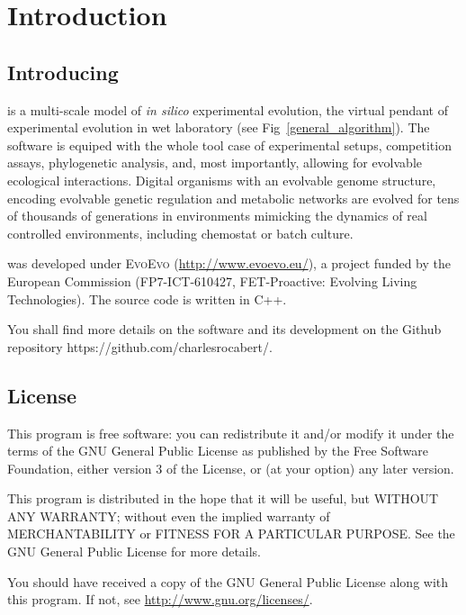 \chapter{Introduction}

\section{Introducing \packageName}

{\packageName} is a multi-scale model of \textit{in silico} experimental evolution, the virtual pendant of experimental evolution in wet laboratory (see Fig~\ref{general_algorithm}).
The software is equiped with the whole tool case of experimental setups, competition assays, phylogenetic analysis, and, most importantly, allowing for evolvable ecological interactions. Digital organisms with an evolvable genome structure, encoding evolvable genetic regulation and metabolic networks are evolved for tens of thousands of generations in environments mimicking the dynamics of real controlled environments, including chemostat or batch culture.

{\packageName} was developed under \textsc{EvoEvo} (\href{http://www.evoevo.eu/}{http://www.evoevo.eu/}), a project funded by the European Commission (FP7-ICT-610427, FET-Proactive: Evolving Living Technologies). The source code is written in C++.

You shall find more details on the software and its development on the Github repository https://github.com/charlesrocabert/{\packageName}.

\section{License}

This program is free software: you can redistribute it and/or modify it under the terms of the GNU General Public License as published by the Free Software Foundation, either version 3 of the License, or (at your option) any later version.

This program is distributed in the hope that it will be useful, but WITHOUT ANY WARRANTY; without even the implied warranty of MERCHANTABILITY or FITNESS FOR A PARTICULAR PURPOSE. See the GNU General Public License for more details.

You should have received a copy of the GNU General Public License along with this program. If not, see \href{http://www.gnu.org/licenses/}{http://www.gnu.org/licenses/}.

